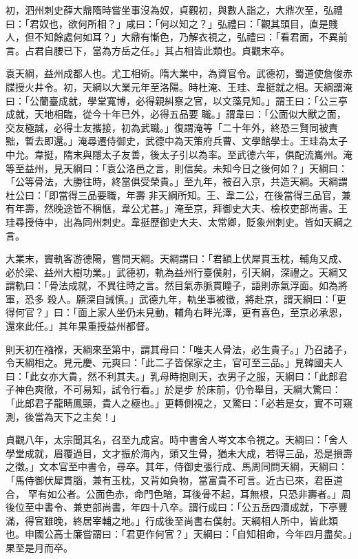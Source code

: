\begin{pinyinscope}
 初，泗州刺史薛大鼎隋時嘗坐事沒為奴，貞觀初，與數人詣之，大鼎次至，弘禮曰：「君奴也，欲何所相？」咸曰：「何以知之？」弘禮曰：「觀其頭目，直是賤
 人，但不知餘處何如耳？」大鼎有慚色，乃解衣視之，弘禮曰：「看君面，不異前言。占君自腰已下，當為方岳之任。」其占相皆此類也。貞觀末卒。



 袁天綱，益州成都人也。尤工相術。隋大業中，為資官令。武德初，蜀道使詹俊赤牒授火井令。初，天綱以大業元年至洛陽。時杜淹、王珪、韋挺就之相。天綱謂淹曰：「公蘭臺成就，學堂寬博，必得親糾察之官，以文藻見知。」謂王曰：「公三亭成就，天地相臨，從今十年已外，必得五品要
 職。」謂韋曰：「公面似大獸之面，交友極誠，必得士友攜接，初為武職。」復謂淹等「二十年外，終恐三賢同被責黜，暫去即還。」淹尋遷侍御史，武德中為天策府兵曹、文學館學士。王珪為太子中允。韋挺，隋末與隱太子友善，後太子引以為率。至武德六年，俱配流巂州。淹等至益州，見天綱曰：「袁公洛邑之言，則信矣。未知今日之後何如？」天綱曰：「公等骨法，大勝往時，終當俱受榮貴。」至九年，被召入京，共造天綱。天綱謂杜公曰：「即當得三品要職，年壽
 非天綱所知。王、韋二公，在後當得三品官，兼有年壽，然晚途皆不稱愜，韋公尤甚。」淹至京，拜御史大夫、檢校吏部尚書。王珪尋授侍中，出為同州刺史。韋挺歷御史大夫、太常卿，貶象州刺史。皆如天綱之言。



 大業末，竇軌客游德陽，嘗問天綱。天綱謂曰：「君額上伏犀貫玉枕，輔角又成、必於梁、益州大樹功業。」武德初，軌為益州行臺僕射，引天綱，深禮之。天綱又謂軌曰：「骨法成就，不異往時之言。然目氣赤脈貫瞳子，語則赤氣浮面。如為將軍，恐多
 殺人。願深自誡慎。」武德九年，軌坐事被徵，將赴京，謂天綱曰：「更得何官？」曰：「面上家人坐仍未見動，輔角右畔光澤，更有喜色，至京必承恩，還來此任。」其年果重授益州都督。



 則天初在襁褓，天綱來至第中，謂其母曰：「唯夫人骨法，必生貴子。」乃召諸子，令天綱相之。見元慶、元爽曰：「此二子皆保家之主，官可至三品。」見韓國夫人曰：「此女亦大貴，然不利其夫。」乳母時抱則天，衣男子之服，天綱曰：「此郎君子神色爽徹，不可易知，試令行看。」於是步
 於床前，仍令舉目，天綱大驚曰：「此郎君子龍睛鳳頸，貴人之極也。」更轉側視之，又驚曰：「必若是女，實不可窺測，後當為天下之主矣！」



 貞觀八年，太宗聞其名，召至九成宮。時中書舍人岑文本令視之。天綱曰：「舍人學堂成就，眉覆過目，文才振於海內，頭又生骨，猶未大成，若得三品，恐是損壽之徵。」文本官至中書令，尋卒。其年，侍御史張行成、馬周同問天綱，天綱曰：「馬侍御伏犀貫腦，兼有玉枕，又背如負物，當富貴不可言。近古已來，君臣道合，
 罕有如公者。公面色赤，命門色暗，耳後骨不起，耳無根，只恐非壽者。」周後位至中書令、兼吏部尚書，年四十八卒。謂行成曰：「公五岳四瀆成就，下亭豐滿，得官雖晚，終居宰輔之地。」行成後至尚書右僕射。天綱相人所中，皆此類也。申國公高士廉嘗謂曰：「君更作何官？」天綱曰：「自知相命，今年四月盡矣。」果至是月而卒。




\end{pinyinscope}
